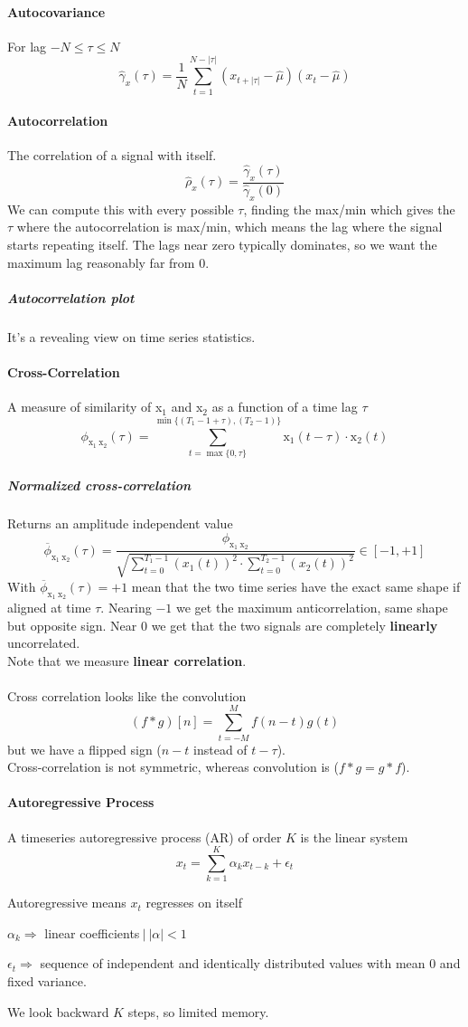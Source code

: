 \documentclass[10pt]{report}
\begin{document}
\paragraph{Autocovariance} For lag $-N\leq \tau \leq N$
$$\hat\gamma_x(\tau) = \frac{1}{N}\sum_{t=1}^{N-|\tau|} (x_{t+|\tau|}-\hat\mu)(x_t - \hat\mu)$$
\paragraph{Autocorrelation} The correlation of a signal with itself. $$\hat\rho_x(\tau)=\frac{\hat\gamma_x(\tau)}{\hat\gamma_x(0)}$$
We can compute this with every possible $\tau$, finding the max/min which gives the $\tau$ where the autocorrelation is max/min, which means the lag where the signal starts repeating itself. The lags near zero typically dominates, so we want the maximum lag reasonably far from 0.
\subparagraph{Autocorrelation plot} It's a revealing view on time series statistics.
\paragraph{Cross-Correlation} A measure of similarity of x$_1$ and x$_2$ as a function of a time lag $\tau$ $$\phi_{\text{x}_1\:\text{x}_2}(\tau)=\sum_{t = \max\{0,\tau\}}^{\min\{(T_1 - 1 + \tau), (T_2 - 1)\}} \text{x}_1(t-\tau)\cdot \text{x}_2(t)$$
\subparagraph{Normalized cross-correlation} Returns an amplitude independent value
$$\overline{\phi}_{\text{x}_1\:\text{x}_2}(\tau) = \frac{\phi_{\text{x}_1\:\text{x}_2}}{\sqrt{\sum_{t=0}^{T_1-1}(x_1(t))^2\cdot\sum_{t=0}^{T_2-1}(x_2(t))^2}} \in [-1,+1]$$
With $\overline{\phi}_{\text{x}_1\:\text{x}_2}(\tau) = +1$ mean that the two time series have the exact same shape if aligned at time $\tau$. Nearing $-1$ we get the maximum anticorrelation, same shape but opposite sign. Near 0 we get that the two signals are completely \textbf{linearly} uncorrelated.\\
Note that we measure \textbf{linear correlation}.\\\\
Cross correlation looks like the convolution $$(f * g)[n]=\sum_{t=-M}^M f(n-t)g(t)$$ but we have a flipped sign ($n-t$ instead of $t-\tau$).\\
Cross-correlation is not symmetric, whereas convolution is ($f * g = g * f$).
\paragraph{Autoregressive Process} A timeseries autoregressive process (AR) of order $K$ is the linear system $$x_t = \sum_{k=1}^K \alpha_k x_{t-k} + \epsilon_t$$\begin{list}{}{}
	\item Autoregressive means $x_t$ regresses on itself
	\item $\alpha_k \Rightarrow$ linear coefficients$\:|\:|\alpha|<1$
	\item $\epsilon_t\Rightarrow$ sequence of independent and identically distributed values with mean 0 and fixed variance.
	\item We look backward $K$ steps, so limited memory.
\end{list}
\end{document}
